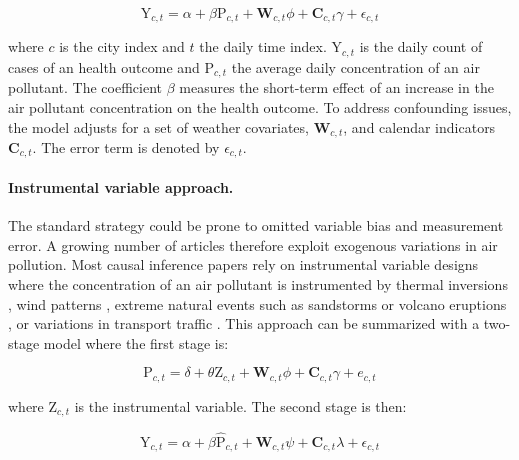 \documentclass[12pt]{article}
\begin{document}
        \begin{equation*}
        \text{Y}_{c,t} = \alpha + \beta\text{P}_{c,t} + \textbf{W}_{c,t}\phi + \textbf{C}_{c,t}\gamma + \epsilon_{c,t}
        \end{equation*}
        
        \noindent where $c$ is the city index and $t$ the daily time index. $\text{Y}_{c,t}$ is the daily count of cases of an health outcome and $\text{P}_{c,t}$ the average daily concentration of an air pollutant. The coefficient $\beta$ measures the short-term effect of an increase in the air pollutant concentration on the health outcome. To address confounding issues, the model adjusts for a set of weather covariates,  $\textbf{W}_{c,t}$, and calendar indicators $\textbf{C}_{c,t}$. The error term is denoted by $\epsilon_{c,t}$.
        

        \paragraph{Instrumental variable approach.} The standard strategy could be prone to omitted variable bias and measurement error. A growing number of articles therefore exploit exogenous variations in air pollution. Most causal inference papers rely on instrumental variable designs where the concentration of an air pollutant is instrumented by thermal inversions \citep{arceo_does_2016}, wind patterns \citep{schwartz_national_2018, deryugina_mortality_2019, isphording_pandemic_2021}, extreme natural events such as sandstorms or volcano eruptions \citep{ebenstein_particulate_2015, halliday_vog_2019}, or variations in transport traffic \citep{moretti_pollution_2011, knittel_caution_2016, schlenker_airports_2016}. This approach can be summarized with a two-stage model where the first stage is:
        
        \begin{equation*}
        \text{P}_{c,t} = \delta + \theta\text{Z}_{c,t} + \textbf{W}_{c,t}\phi + \textbf{C}_{c,t}\gamma + e_{c,t}
        \end{equation*}
        
        \noindent where $\text{Z}_{c,t}$ is the instrumental variable. The second stage is then:
        
        \begin{equation*}
        \text{Y}_{c,t} = \alpha + \beta\widehat{\text{P}}_{c,t} + \textbf{W}_{c,t}\psi + \textbf{C}_{c,t}\lambda + \epsilon_{c,t}
        \end{equation*}
        
\end{document}
